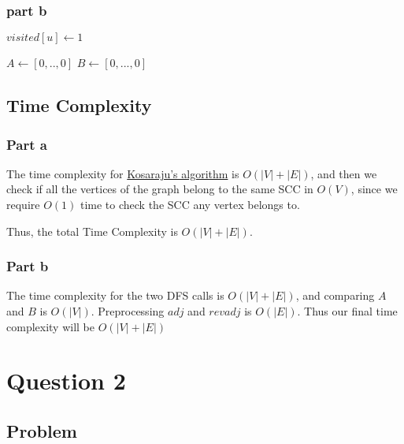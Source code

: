 \documentclass{article}
\begin{document}
\subsubsection{part b}
\begin{algorithmic}
    \State $visited[u] \gets 1$
    \EndIf
    \EndFor
    \EndProcedure

    \State $A \gets [0,..,0]$
    \State $B \gets [0,...,0]$
    \State {}
    \State {}
    \EndIf
    \EndFor
    \newline
    \EndProcedure
    
\end{algorithmic}


\subsection{Time Complexity}

\subsubsection{Part a}

The time complexity for \underline{Kosaraju's algorithm} is $O(|V| + |E|)$, and then we check if all the vertices of the graph belong to the same SCC in $O(V)$, since we require $O(1)$ time to check the SCC any vertex belongs to.

Thus, the total Time Complexity is $O(|V| + |E|)$.

\subsubsection{Part b}
The time complexity for the two DFS calls is $O(|V| + |E|)$, and comparing $A$ and $B$ is $O(|V|)$. Preprocessing $adj$ and $revadj$ is $O(|E|)$. Thus our final time complexity will be $O(|V| + |E|)$

\section{Question 2}

\subsection{Problem}
\end{document}
